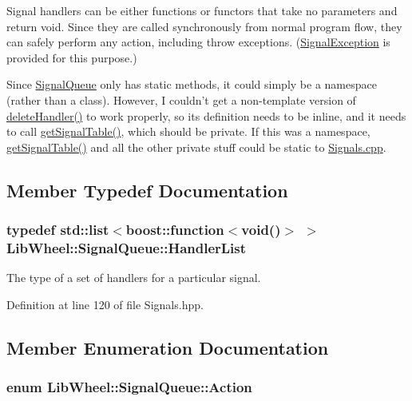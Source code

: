 \-Signal handlers can be either functions or functors that take no parameters and return {\ttfamily void}. \-Since they are called synchronously from normal program flow, they can safely perform any action, including throw exceptions. (\hyperlink{classLibWheel_1_1SignalException}{\-Signal\-Exception} is provided for this purpose.)

\-Since \hyperlink{classLibWheel_1_1SignalQueue}{\-Signal\-Queue} only has static methods, it could simply be a namespace (rather than a class). \-However, \-I couldn't get a non-\/template version of \hyperlink{classLibWheel_1_1SignalQueue_a16b57819e9a601533b9bff97ec08b5e5}{delete\-Handler()} to work properly, so its definition needs to be inline, and it needs to call \hyperlink{classLibWheel_1_1SignalQueue_a0e04644ce369cc519197043735986f9c}{get\-Signal\-Table()}, which should be private. \-If this was a namespace, \hyperlink{classLibWheel_1_1SignalQueue_a0e04644ce369cc519197043735986f9c}{get\-Signal\-Table()} and all the other private stuff could be static to \hyperlink{Signals_8cpp}{\-Signals.\-cpp}. 

\subsection{\-Member \-Typedef \-Documentation}
\hypertarget{classLibWheel_1_1SignalQueue_a4bfc25c5e467e668c89ee0b0ceaa7591}{
\subsubsection[{\-Handler\-List}]{\setlength{\rightskip}{0pt plus 5cm}typedef std\-::list$<$boost\-::function$<$void()$>$ $>$ {\bf \-Lib\-Wheel\-::\-Signal\-Queue\-::\-Handler\-List}}}
\label{classLibWheel_1_1SignalQueue_a4bfc25c5e467e668c89ee0b0ceaa7591}


\-The type of a set of handlers for a particular signal. 



\-Definition at line 120 of file \-Signals.\-hpp.



\subsection{\-Member \-Enumeration \-Documentation}
\hypertarget{classLibWheel_1_1SignalQueue_a5a366bd8de3564c5e3001233464d20e3}{
\subsubsection[{\-Action}]{\setlength{\rightskip}{0pt plus 5cm}enum {\bf \-Lib\-Wheel\-::\-Signal\-Queue\-::\-Action}}}
\label{classLibWheel_1_1SignalQueue_a5a366bd8de3564c5e3001233464d20e3}


